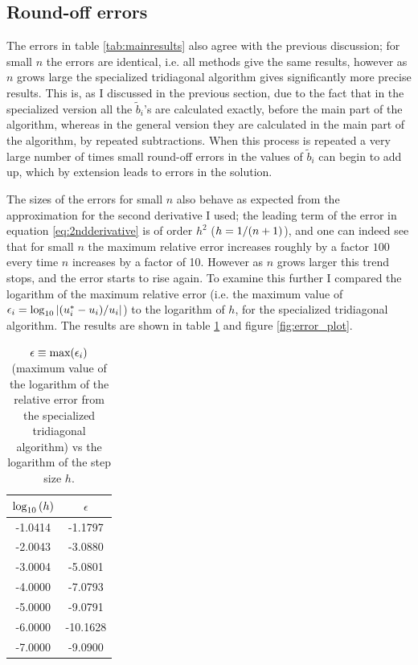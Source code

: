 \documentclass[a4paper,english]{article}
\newcommand\norm[1]{\left\lvert#1\right\rvert}
\let\originalleft\left
\let\originalright\right
\renewcommand{\left}{\mathopen{}\mathclose\bgroup\originalleft}
\renewcommand{\right}{\aftergroup\egroup\originalright}
\begin{document}
\subsection{Round-off errors}
The errors in table \ref{tab:mainresults} also agree with the previous discussion; for small $n$ the errors are identical, i.e. all methods give the same results, however as $n$ grows large the specialized tridiagonal algorithm gives significantly more precise results. This is, as  I discussed in the previous section, due to the fact that in the specialized version all the $\tilde{b}_i$'s are calculated exactly, before the main part of the algorithm, whereas in the general version they are calculated in the main part of the algorithm, by repeated subtractions. When this process is repeated a very large number of times small round-off errors in the values of $\tilde{b}_i$ can begin to add up, which by extension leads to errors in the solution. \par
The sizes of the errors for small $n$ also behave as expected from the approximation for the second derivative I used; the leading term of the error in equation \ref{eq:2ndderivative} is of order $h^2$\cite{lecturenotes} ($h=1/\left(n+1\right)$), and one can indeed see that for small $n$ the maximum relative error increases roughly by a factor $100$ every time $n$ increases by a factor of 10. However as $n$ grows larger this trend stops, and the error starts to rise again. To examine this further I compared the logarithm of the maximum relative error (i.e. the maximum value of $\epsilon_i = \log_{10}{\norm{\left(u^*_i-u_i\right)/u_i}}$) to the logarithm of $h$, for the specialized tridiagonal algorithm. The results are shown in table \ref{tab:error_tab} and figure \ref{fig:error_plot}. \par
\begin{table}[ht]
  \centering
  \begin{tabular}{c c} \toprule
    $\log_{10}{\left(h\right)}$ & $\epsilon$ \\\midrule
    -1.0414 & -1.1797 \\
    -2.0043 & -3.0880 \\
    -3.0004 & -5.0801 \\
    -4.0000 & -7.0793 \\
    -5.0000 & -9.0791 \\
    -6.0000 & -10.1628 \\
    -7.0000 & -9.0900\\\bottomrule
  \end{tabular}
  \caption{$\epsilon \equiv \text{max}\left(\epsilon_i\right)$ (maximum value of the logarithm of the relative error from the specialized tridiagonal algorithm) vs the logarithm of the step size $h$.}
  \label{tab:error_tab}
\end{table}
\end{document}
